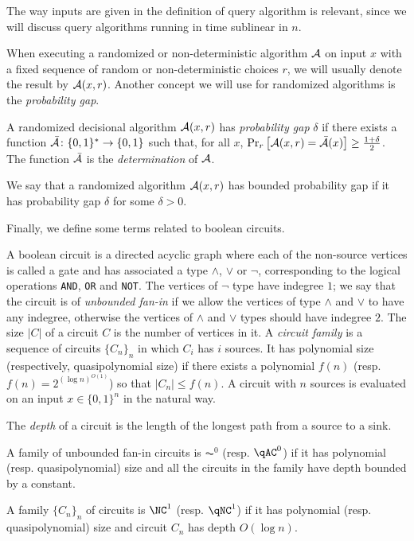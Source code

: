 The way inputs are given in the definition of query algorithm is relevant, since we will 
discuss query algorithms running in time sublinear in $n$. 

When executing a randomized or non-deterministic algorithm $\mathcal{A}$ on input $x$
with a fixed sequence of 
random or non-deterministic choices $r$, we will usually denote the result by $\mathcal{A}(x, r)$.
Another concept we will use for randomized algorithms is the \emph{probability gap}.

\begin{definition}
A randomized decisional algorithm $\mathcal{A}(x, r)$ has \emph{probability gap} $\delta$ if there exists a function
$\bar{\mathcal{A}} \colon \{0, 1\}^* \to \{0, 1\}$ such that, for all $x$, 
$\text{Pr}_{r}\left[\mathcal{A}(x, r) = \bar{\mathcal{A}}(x)\right] \geq \frac{1 + \delta}{2}$. 
The function $\bar{\mathcal{A}}$ is the \emph{determination} of $\mathcal{A}$.

We say that a randomized algorithm $\mathcal{A}(x, r)$ has bounded probability gap if it has probability gap $\delta$
for some $\delta > 0$. 
\end{definition}

Finally, we define some terms related to boolean circuits. 

A boolean circuit is a directed acyclic graph where each of the non-source vertices is called a 
gate and has associated a type $\wedge$, $\vee$ or $\neg$, corresponding to the logical operations
\texttt{AND}, \texttt{OR} and \texttt{NOT}. The vertices of $\neg$ type have indegree $1$; we say
that the circuit is of \emph{unbounded fan-in} if we allow the vertices of type $\wedge$ and 
$\vee$ to have any indegree, otherwise the vertices of $\wedge$ and $\vee$ types should have
indegree $2$. The size $|C|$ of a circuit $C$ is the number of vertices in it.
A \emph{circuit family} is a sequence of circuits $\{C_n\}_{n}$ in which 
$C_i$ has $i$ sources. It has polynomial size (respectively, quasipolynomial size) if there exists
a polynomial $f(n)$ (resp. $f(n) = 2^{(\log n)^{O(1)}}$) so that $|C_n| \leq f(n)$.
A circuit with $n$ sources is evaluated on an input $x \in \{0, 1\}^n$ in the natural way. 

\begin{definition}
	The \emph{depth} of a circuit is the length of the longest path from a source to a sink.

	A family of unbounded fan-in circuits is $\AC^0$ (resp. $\qAC^0$) if it has polynomial
	(resp. quasipolynomial) size and all the circuits in the family
	have depth bounded by a constant. 

	A family $\{C_n\}_{n}$ of circuits is $\NC^1$  (resp. $\qNC^1$) if it has polynomial 
	(resp. quasipolynomial)
	size and circuit $C_n$
	has depth $O(\log n)$.
\end{definition}

